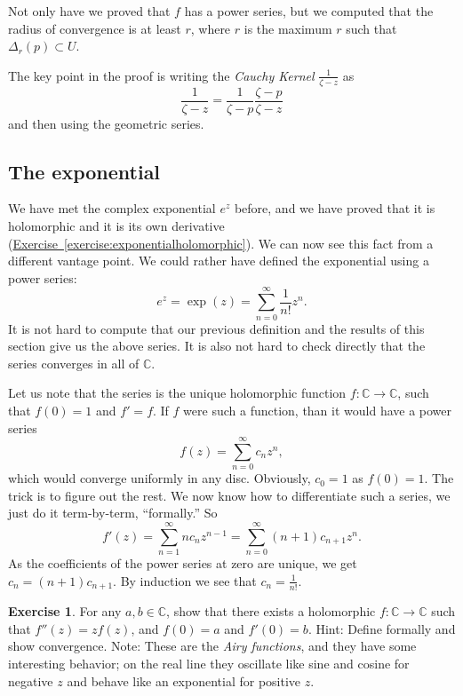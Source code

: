 \documentclass[12pt,openany]{book}
\newcommand{\C}{{\mathbb{C}}}
\newcommand{\myindex}[1]{#1\index{#1}}
\theoremstyle{plain}
\theoremstyle{remark}
\theoremstyle{definition}
\newenvironment{exbox}{%
    \def\FrameCommand{\vrule width 1pt \relax\hspace {10pt}}%
    \MakeFramed {\advance \hsize -\width \FrameRestore }%
}{%
    \endMakeFramed
}
\theoremstyle{exercise}
\newtheorem{exercise}{Exercise}[section]
\theoremstyle{example}
\newcommand{\exerciseref}[1]{\hyperref[#1]{Exercise~\ref*{#1}}}
\begin{document}
Not only have we proved that $f$ has a power series, but we computed
that the radius of convergence is at least $r$, where $r$ is the maximum $r$
such that $\Delta_r(p) \subset U$.

The key point in the proof is writing the \emph{\myindex{Cauchy Kernel}}
$\frac{1}{\zeta-z}$ as
\begin{equation*}
\frac{1}{\zeta-z}
=
\frac{1}{\zeta-p}
\frac{\zeta-p}{\zeta-z}
\end{equation*}
and then using the geometric series.

\subsection{The exponential}

We have met the complex exponential $e^z$ before, and we have proved
that it is holomorphic and it is its own derivative
(\exerciseref{exercise:exponentialholomorphic}).  We can now see this fact
from a different vantage point.  We could rather have defined the exponential
using a power series:
\begin{equation*}
e^z = \exp(z) = \sum_{n=0}^\infty \frac{1}{n!} z^n .
\end{equation*}
It is not hard to compute that our previous definition and the results
of this section give us the above series.  It is also not hard to check
directly that the series converges in all of $\C$.

Let us note that the series is the unique holomorphic function $f \colon \C
\to \C$, such that $f(0)=1$ and $f' = f$.  If $f$ were such a function, than
it would have a power series
\begin{equation*}
f(z) = \sum_{n=0}^\infty c_n z^n ,
\end{equation*}
which would converge uniformly in any disc.  Obviously, $c_0 = 1$
as $f(0) = 1$.  The trick is to figure out the rest.
We now know how to
differentiate such a series, we just do it term-by-term, ``formally.''
So
\begin{equation*}
f'(z) =
\sum_{n=1}^\infty n c_n z^{n-1} =
\sum_{n=0}^\infty (n+1) c_{n+1} z^{n} .
\end{equation*}
As the coefficients of the power series at zero are unique, we get
$c_n = (n+1) c_{n+1}$.  By induction we see that $c_n = \frac{1}{n!}$.

\begin{exbox}
\begin{exercise}
For any $a,b \in \C$, show that there exists a holomorphic $f \colon \C \to
\C$ such that $f''(z) = z f(z)$, and $f(0) = a$ and $f'(0) = b$.
Hint: Define formally and show convergence.
Note: These are the \emph{\myindex{Airy functions}}, and they have some
interesting behavior; on the real line they oscillate like sine and cosine
for negative $z$ and behave like an exponential for positive $z$.
\end{exercise}
\end{exbox}
\end{document}
